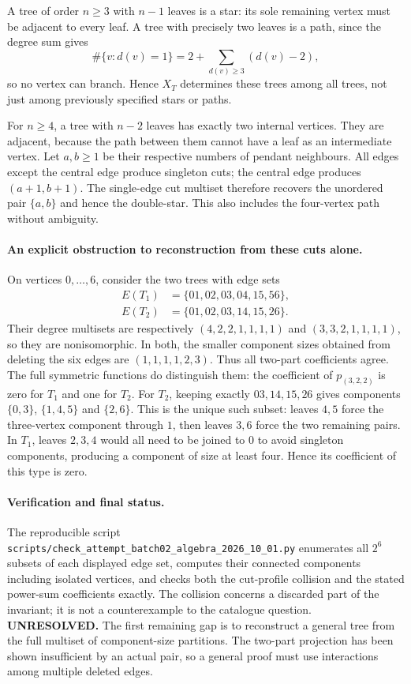 \documentclass[11pt,a4paper]{article}
\begin{document}
A tree of order $n\ge3$ with $n-1$ leaves is a star: its sole remaining
vertex must be adjacent to every leaf. A tree with precisely two leaves
is a path, since the degree sum gives
\[
 \#\{v:d(v)=1\}=2+\sum_{d(v)\ge3}(d(v)-2),
\]
so no vertex can branch. Hence $X_T$ determines these trees among all
trees, not just among previously specified stars or paths.

For $n\ge4$, a tree with $n-2$ leaves has exactly two internal vertices.
They are adjacent, because the path between them cannot have a leaf as
an intermediate vertex. Let $a,b\ge1$ be their respective numbers of
pendant neighbours. All edges except the central edge produce singleton
cuts; the central edge produces $(a+1,b+1)$. The single-edge cut multiset
therefore recovers the unordered pair $\{a,b\}$ and hence the double-star.
This also includes the four-vertex path without ambiguity.

\paragraph{An explicit obstruction to reconstruction from these cuts alone.}
On vertices $0,\ldots,6$, consider the two trees with edge sets
\[
 \begin{split}
 E(T_1)&=\{01,02,03,04,15,56\},\\
 E(T_2)&=\{01,02,03,14,15,26\}.
 \end{split}
\]
Their degree multisets are respectively $(4,2,2,1,1,1,1)$ and
$(3,3,2,1,1,1,1)$, so they are nonisomorphic. In both, the smaller
component sizes obtained from deleting the six edges are
$(1,1,1,1,2,3)$. Thus all two-part coefficients agree.
The full symmetric functions do distinguish them: the coefficient of
$p_{(3,2,2)}$ is zero for $T_1$ and one for $T_2$. For $T_2$, keeping exactly $03,14,15,26$ gives components
$\{0,3\}$, $\{1,4,5\}$ and $\{2,6\}$. This is the unique such
subset: leaves $4,5$ force the three-vertex component through $1$,
then leaves $3,6$ force the two remaining pairs. In $T_1$, leaves
$2,3,4$ would all need to be joined to $0$ to avoid singleton
components, producing a component of size at least four. Hence its
coefficient of this type is zero.

\paragraph{Verification and final status.}
The reproducible script
\texttt{scripts/check\_attempt\_batch02\_algebra\_2026\_10\_01.py}
enumerates all $2^6$ subsets of each displayed edge set, computes their
connected components including isolated vertices, and checks both the
cut-profile collision and the stated power-sum coefficients exactly.
The collision concerns a discarded part of the invariant; it is not
a counterexample to the catalogue question.
\textbf{UNRESOLVED.} The first remaining gap is to reconstruct a general
tree from the full multiset of component-size partitions. The two-part
projection has been shown insufficient by an actual pair, so a general
proof must use interactions among multiple deleted edges.
\end{document}
